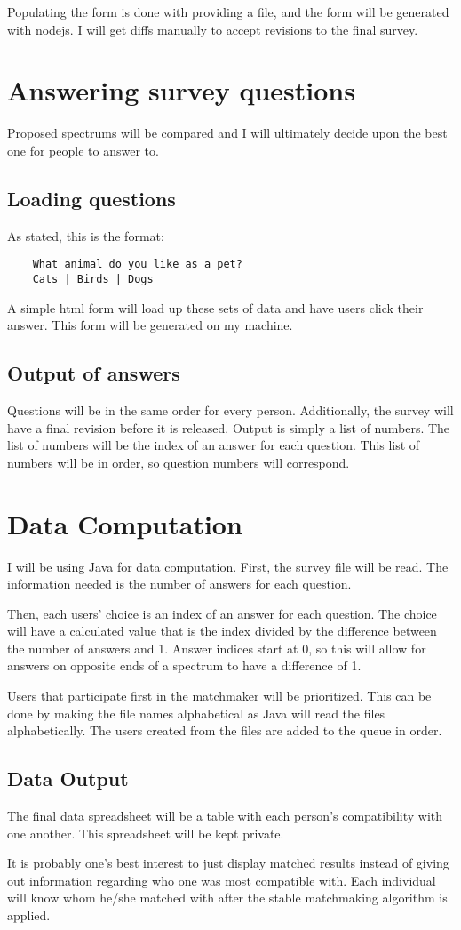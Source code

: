 \documentclass[12pt]{article}
\begin{document}
Populating the form is done with providing a file, and the form will be
generated with nodejs. I will get diffs manually to accept revisions to the
final survey.

\section{Answering survey questions}
Proposed spectrums will be compared and I will ultimately decide upon the best
one for people to answer to.

\subsection{Loading questions}
As stated, this is the format:
\begin{verbatim}
    What animal do you like as a pet?
    Cats | Birds | Dogs
\end{verbatim}

A simple html form will load up these sets of data and have users click their
answer. This form will be generated on my machine.

\subsection{Output of answers}
Questions will be in the same order for every person. Additionally, the survey
will have a final revision before it is released. Output is simply a list of
numbers. The list of numbers will be the index of an answer for each question.
This list of numbers will be in order, so question numbers will correspond.

\section{Data Computation}
I will be using Java for data computation.
First, the survey file will be read. The information needed is the number of
answers for each question.

Then, each users' choice is an index of an answer for each question. The choice
will have a calculated value that is the index divided by the difference between
the number of answers and 1. Answer indices start at 0, so this will allow for
answers on opposite ends of a spectrum to have a difference of 1.

Users that participate first in the matchmaker will be prioritized. This can be
done by making the file names alphabetical as Java will read the files
alphabetically. The users created from the files are added to the queue in
order.

\subsection{Data Output}
The final data spreadsheet will be a table with each person's compatibility with
one another. This spreadsheet will be kept private.

It is probably one's best interest to just display matched results instead of
giving out information regarding who one was most compatible with. Each
individual will know whom he/she matched with after the stable matchmaking
algorithm is applied.
\end{document}
